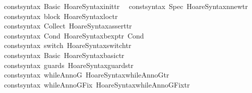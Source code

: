 \begin{isabellebody}
\ \ {\isacharparenleft}{\isacharat}{\isacharbraceleft}const{\isacharunderscore}syntax\ Basic{\isacharbraceright}{\isacharcomma}\ Hoare{\isacharunderscore}Syntax{\isachardot}init{\isacharunderscore}tr{\isacharprime}{\isacharparenright}{\isacharcomma}\isanewline
\ \ {\isacharparenleft}{\isacharat}{\isacharbraceleft}const{\isacharunderscore}syntax\ Spec{\isacharbraceright}{\isacharcomma}\ Hoare{\isacharunderscore}Syntax{\isachardot}nnew{\isacharunderscore}tr{\isacharprime}{\isacharparenright}{\isacharcomma}\isanewline
\ \ {\isacharparenleft}{\isacharat}{\isacharbraceleft}const{\isacharunderscore}syntax\ block{\isacharbraceright}{\isacharcomma}\ Hoare{\isacharunderscore}Syntax{\isachardot}loc{\isacharunderscore}tr{\isacharprime}{\isacharparenright}{\isacharcomma}\isanewline
\ \ {\isacharparenleft}{\isacharat}{\isacharbraceleft}const{\isacharunderscore}syntax\ Collect{\isacharbraceright}{\isacharcomma}\ Hoare{\isacharunderscore}Syntax{\isachardot}assert{\isacharunderscore}tr{\isacharprime}{\isacharparenright}{\isacharcomma}\isanewline
\ \ {\isacharparenleft}{\isacharat}{\isacharbraceleft}const{\isacharunderscore}syntax\ Cond{\isacharbraceright}{\isacharcomma}\ Hoare{\isacharunderscore}Syntax{\isachardot}bexp{\isacharunderscore}tr{\isacharprime}\ {\isachardoublequote}{\isacharunderscore}Cond{\isachardoublequote}{\isacharparenright}{\isacharcomma}\isanewline
\ \ {\isacharparenleft}{\isacharat}{\isacharbraceleft}const{\isacharunderscore}syntax\ switch{\isacharbraceright}{\isacharcomma}\ Hoare{\isacharunderscore}Syntax{\isachardot}switch{\isacharunderscore}tr{\isacharprime}{\isacharparenright}{\isacharcomma}\isanewline
\ \ {\isacharparenleft}{\isacharat}{\isacharbraceleft}const{\isacharunderscore}syntax\ Basic{\isacharbraceright}{\isacharcomma}\ Hoare{\isacharunderscore}Syntax{\isachardot}basic{\isacharunderscore}tr{\isacharprime}{\isacharparenright}{\isacharcomma}\isanewline
\ \ {\isacharparenleft}{\isacharat}{\isacharbraceleft}const{\isacharunderscore}syntax\ guards{\isacharbraceright}{\isacharcomma}\ Hoare{\isacharunderscore}Syntax{\isachardot}guards{\isacharunderscore}tr{\isacharprime}{\isacharparenright}{\isacharcomma}\isanewline
\ \ {\isacharparenleft}{\isacharat}{\isacharbraceleft}const{\isacharunderscore}syntax\ whileAnnoG{\isacharbraceright}{\isacharcomma}\ Hoare{\isacharunderscore}Syntax{\isachardot}whileAnnoG{\isacharunderscore}tr{\isacharprime}{\isacharparenright}{\isacharcomma}\isanewline
\ \ {\isacharparenleft}{\isacharat}{\isacharbraceleft}const{\isacharunderscore}syntax\ whileAnnoGFix{\isacharbraceright}{\isacharcomma}\ Hoare{\isacharunderscore}Syntax{\isachardot}whileAnnoGFix{\isacharunderscore}tr{\isacharprime}{\isacharparenright}{\isacharcomma}\isanewline

\end{isabellebody}
